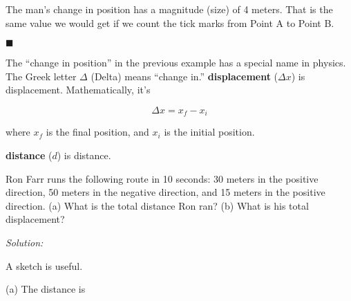 \documentclass[dvipsnames]{article}
\begin{document}
The man's change in position has a magnitude (size) of 4 meters. That is the same value we would get if we count the tick marks from Point A to Point B.

\hfill $\blacksquare$

The ``change in position'' in the previous example has a special name in physics. The Greek letter $\Delta$ (Delta) means ``change in.'' \textbf{\Gls{displacement}} ($\Delta x$) is \glsdesc{displacement}. Mathematically, it's

\begin{equation}
    \Delta x = x_f - x_i
\end{equation}

where $x_f$ is the final position, and $x_i$ is the initial position.


\textbf{\Gls{distance}} ($d$) is \glsdesc{distance}.

\begin{example} \label{example-ron-farr}
    Ron Farr runs the following route in 10 seconds: 30 meters in the positive direction, 50 meters in the negative direction, and 15 meters in the positive direction. (a) What is the total distance Ron ran? (b) What is his total displacement?
\end{example}

\textit{Solution:}

A sketch is useful.

\begin{center}
\end{center}

(a) The distance is
\end{document}
